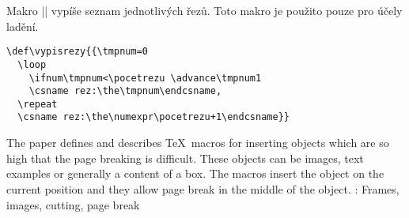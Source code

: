 \documentclass{csbulletin}
\def\JSvfil{\vfil}
\def\JSvss{\vskip0ptminus12pt}
\def\JSbreak{\break}
\def\TODO#1{{\color{red}\footnote{\color{red}{\bf TODO:} \ignorespaces#1}}}
\begin{document}
Makro |\vypisrezy| vypíše seznam jednotlivých řezů. Toto makro je použito pouze pro účely ladění.
\begin{Verbatim}
\def\vypisrezy{{\tmpnum=0
  \loop
    \ifnum\tmpnum<\pocetrezu \advance\tmpnum1
    \csname rez:\the\tmpnum\endcsname,
  \repeat
  \csname rez:\the\numexpr\pocetrezu+1\endcsname}}
\end{Verbatim}








\iffalse
\def\refname{Seznam literatury}
\begin{thebibliography}{9}
\selectlanguage{english}
\raggedright

\bibitem{literate}
Jan Šustek. Generování dokumentovaného zdrojového souboru po blocích v~\TeX u. Zpravodaj Československého sdružení uživatelů \TeX u, 33(3--4):XX--YY, 2023.\TODO{Aktualizovat odkaz podle skutečnosti.}

\bibitem{rezaniweb}
Jan Šustek.
\url{https://github.com/jsustek/rezani/blob/main/rezani.tex}

\end{thebibliography}
\fi

\begingroup
\sloppy
\printbibliography
\endgroup


\begin{summary}
The paper defines and describes \TeX\ macros for inserting objects which are so high that the page breaking is difficult. These objects can be images, text examples or generally a content of a box. The macros insert the object on the current position and they allow page break in the middle of the object.
\keywords: Frames, images, cutting, page break
\end{summary}
\end{document}

